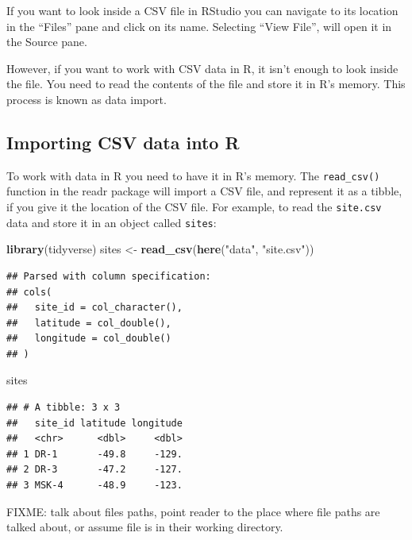 \documentclass[]{Nemilov}
\newenvironment{Shaded}{\begin{snugshade}}{\end{snugshade}}
\newcommand{\KeywordTok}[1]{\textcolor[rgb]{0.13,0.29,0.53}{\textbf{#1}}}
\newcommand{\NormalTok}[1]{#1}
\newcommand{\StringTok}[1]{\textcolor[rgb]{0.31,0.60,0.02}{#1}}
\begin{document}
If you want to look inside a CSV file in RStudio you can navigate to its location in the ``Files'' pane and click on its name. Selecting ``View File'', will open it in the Source pane.

However, if you want to work with CSV data in R, it isn't enough to look inside the file. You need to read the contents of the file and store it in R's memory. This process is known as data import.

\hypertarget{importing-csv-data-into-r}{%
\subsection{Importing CSV data into R}\label{importing-csv-data-into-r}}

To work with data in R you need to have it in R's memory. The \texttt{read\_csv()} function in the readr package will import a CSV file, and represent it as a tibble, if you give it the location of the CSV file. For example, to read the \texttt{site.csv} data and store it in an object called \texttt{sites}:

\begin{Shaded}
\begin{Highlighting}[]
\KeywordTok{library}\NormalTok{(tidyverse)}
\NormalTok{sites <-}\StringTok{ }\KeywordTok{read_csv}\NormalTok{(}\KeywordTok{here}\NormalTok{(}\StringTok{"data"}\NormalTok{, }\StringTok{"site.csv"}\NormalTok{))}
\end{Highlighting}
\end{Shaded}

\begin{verbatim}
## Parsed with column specification:
## cols(
##   site_id = col_character(),
##   latitude = col_double(),
##   longitude = col_double()
## )
\end{verbatim}

\begin{Shaded}
\begin{Highlighting}[]
\NormalTok{sites}
\end{Highlighting}
\end{Shaded}

\begin{verbatim}
## # A tibble: 3 x 3
##   site_id latitude longitude
##   <chr>      <dbl>     <dbl>
## 1 DR-1       -49.8     -129.
## 2 DR-3       -47.2     -127.
## 3 MSK-4      -48.9     -123.
\end{verbatim}

FIXME: talk about files paths, point reader to the place where file paths are talked about, or assume file is in their working directory.
\end{document}
